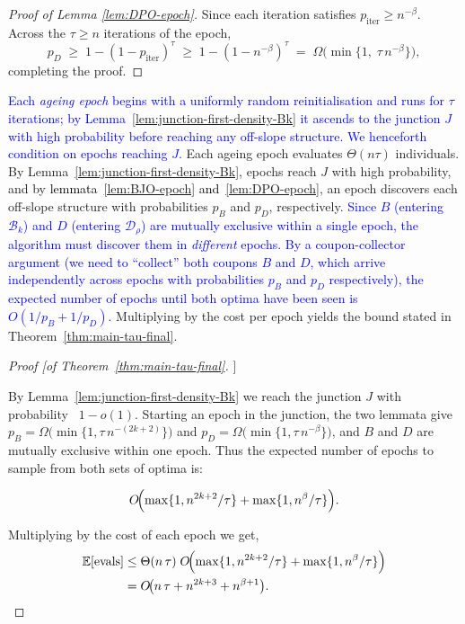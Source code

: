 \documentclass[lettersize,journal]{IEEEtran}
\begin{document}
\begin{proof}[Proof of Lemma \ref{lem:DPO-epoch}]
Since each iteration satisfies \(p_{\text{iter}}\ge n^{-\beta}\).
	Across the \(\tau\ge n\) iterations of the epoch,
	\[
	p_D
	\;\ge\;
	1-(1-p_{\text{iter}})^{\tau}
	\;\ge\;
1-(1-n^{-\beta})^\tau 
	\;=\;
	\Omega\!\bigl(\min\{1,\;\tau\,n^{-\beta}\}\bigr),
	\]
	completing the proof.
\end{proof}


\textcolor{blue}{Each \emph{ageing epoch} begins with a uniformly random reinitialisation and
runs for $\tau$ iterations; by Lemma~\ref{lem:junction-first-density-Bk} it
ascends to the junction $J$ with high probability before reaching any
off-slope structure.  We henceforth condition on epochs reaching $J$.}
Each ageing epoch evaluates $\Theta(n\tau)$ individuals.
By Lemma~\ref{lem:junction-first-density-Bk}, epochs reach $J$ with high probability, and by \textcolor{black}{lemmata~\ref{lem:BJO-epoch} and~\ref{lem:DPO-epoch}}, an epoch discovers each off-slope structure with probabilities $p_B$ and $p_D$, respectively.
\textcolor{blue}{Since $B$ (entering $\mathcal{B}_k$) and $D$ (entering $\mathcal{D}_\rho$) are
mutually exclusive within a single epoch, the algorithm must discover them in
\emph{different} epochs.
By a coupon-collector argument (we need to ``collect'' both coupons $B$ and
$D$, which arrive independently across epochs with probabilities $p_B$ and
$p_D$ respectively), the expected number of epochs until both optima have been seen
is $O(1/p_B + 1/p_D)$.}
Multiplying by the cost per epoch yields the bound stated in Theorem~\ref{thm:main-tau-final}.

\begin{proof}[Proof [of Theorem~\ref{thm:main-tau-final}]]

By Lemma~\ref{lem:junction-first-density-Bk} we reach the junction $J$ with probability \ \(1-o(1)\).
	Starting an epoch in the junction, the two lemmata give
$p_B=\Omega\!\bigl(\min\{1,\tau\,n^{-(2k+2)}\}\bigr)$ and
	$p_D=\Omega\!\bigl(\min\{1,\tau\,n^{-\beta}\}\bigr)$,
and \(B\) and \(D\) are mutually exclusive within one epoch. Thus the expected number of epochs to sample from both sets of optima is:
	
\[
O\!\Bigl(
	\max\{1,n^{2k+2}/\tau\}
	+\max\{1,n^{\beta}/\tau\}
	\Bigr).
	\]
	
Multiplying by the cost of each epoch we get,
	\begin{align*}
		\mathbb{E}[\text{evals}]
		&\le
		\Theta(n\,\tau)\;
		O\!\Bigl(
		\max\{1,n^{2k+2}/\tau\}
		+\max\{1,n^{\beta}/\tau\}
		\Bigr)
		\\&=
		O\!\bigl(
		n\,\tau
		+n^{2k+3}
		+n^{\beta+1}
		\bigr).
	\end{align*}
\end{proof}
\end{document}
